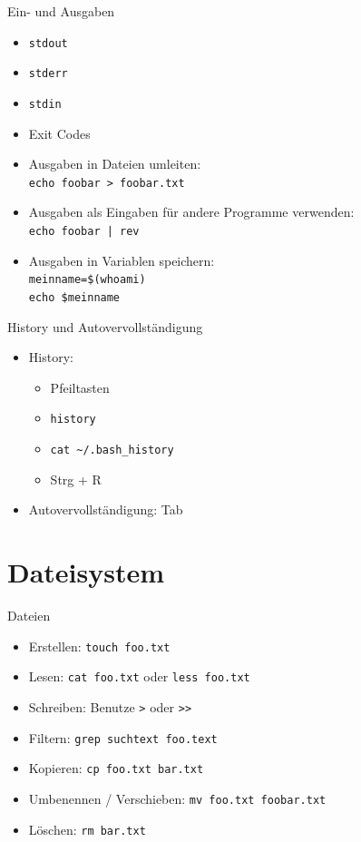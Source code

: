 \documentclass[compress]{beamer}
\begin{document}
\begin{frame}[fragile]{Ein- und Ausgaben}
\begin{itemize}
\item \verb+stdout+
\item \verb+stderr+
\item \verb+stdin+
\item Exit Codes
\item Ausgaben in Dateien umleiten:\\
\verb+echo foobar > foobar.txt+
\item Ausgaben als Eingaben für andere Programme verwenden: \\
\verb+echo foobar | rev+
\item Ausgaben in Variablen speichern:\\
\verb+meinname=$(whoami)+\\
\verb+echo $meinname+
\end{itemize}
\end{frame}

\begin{frame}[fragile]{History und Autovervollständigung}
\begin{itemize}
\item History:
\begin{itemize}
\item Pfeiltasten
\item \verb+history+
\item \verb+cat ~/.bash_history+
\item Strg + R
\end{itemize}
\item Autovervollständigung: Tab
\end{itemize}
\end{frame}

\section{Dateisystem}

\begin{frame}[fragile]{Dateien}
\begin{itemize}
\item Erstellen: \verb+touch foo.txt+
\item Lesen: \verb+cat foo.txt+ oder \verb+less foo.txt+
\item Schreiben: Benutze \verb+>+ oder \verb+>>+
\item Filtern: \verb+grep suchtext foo.text+
\item Kopieren: \verb+cp foo.txt bar.txt+
\item Umbenennen / Verschieben: \verb+mv foo.txt foobar.txt+
\item Löschen: \verb+rm bar.txt+
\end{itemize}
\end{frame}
\end{document}
